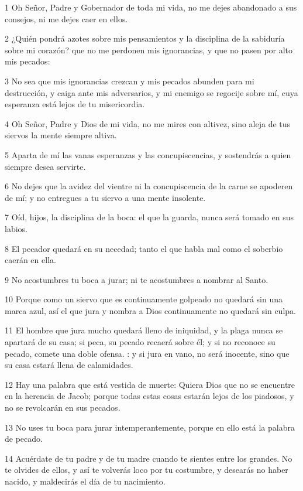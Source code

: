 \par 1 Oh Señor, Padre y Gobernador de toda mi vida, no me dejes abandonado a sus consejos, ni me dejes caer en ellos.
\par 2 ¿Quién pondrá azotes sobre mis pensamientos y la disciplina de la sabiduría sobre mi corazón? que no me perdonen mis ignorancias, y que no pasen por alto mis pecados:
\par 3 No sea que mis ignorancias crezcan y mis pecados abunden para mi destrucción, y caiga ante mis adversarios, y mi enemigo se regocije sobre mí, cuya esperanza está lejos de tu misericordia.
\par 4 Oh Señor, Padre y Dios de mi vida, no me mires con altivez, sino aleja de tus siervos la mente siempre altiva.
\par 5 Aparta de mí las vanas esperanzas y las concupiscencias, y sostendrás a quien siempre desea servirte.
\par 6 No dejes que la avidez del vientre ni la concupiscencia de la carne se apoderen de mí; y no entregues a tu siervo a una mente insolente.
\par 7 Oíd, hijos, la disciplina de la boca: el que la guarda, nunca será tomado en sus labios.
\par 8 El pecador quedará en su necedad; tanto el que habla mal como el soberbio caerán en ella.
\par 9 No acostumbres tu boca a jurar; ni te acostumbres a nombrar al Santo.
\par 10 Porque como un siervo que es continuamente golpeado no quedará sin una marca azul, así el que jura y nombra a Dios continuamente no quedará sin culpa.
\par 11 El hombre que jura mucho quedará lleno de iniquidad, y la plaga nunca se apartará de su casa; si peca, su pecado recaerá sobre él; y si no reconoce su pecado, comete una doble ofensa. : y si jura en vano, no será inocente, sino que su casa estará llena de calamidades.
\par 12 Hay una palabra que está vestida de muerte: Quiera Dios que no se encuentre en la herencia de Jacob; porque todas estas cosas estarán lejos de los piadosos, y no se revolcarán en sus pecados.
\par 13 No uses tu boca para jurar intemperantemente, porque en ello está la palabra de pecado.
\par 14 Acuérdate de tu padre y de tu madre cuando te sientes entre los grandes. No te olvides de ellos, y así te volverás loco por tu costumbre, y desearás no haber nacido, y maldecirás el día de tu nacimiento.
